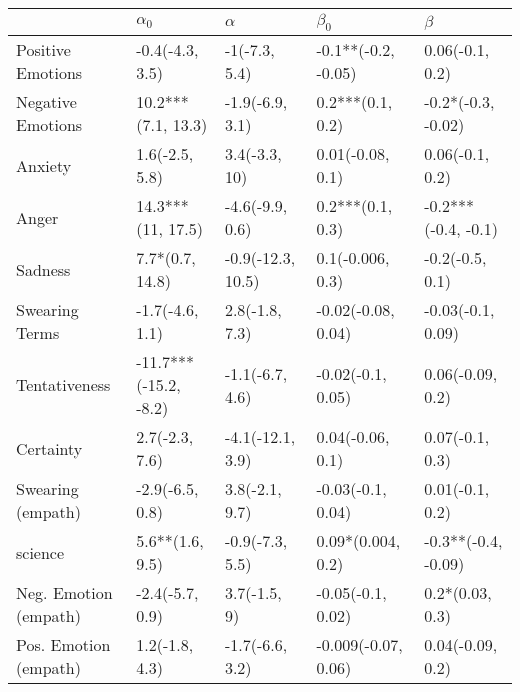 \begin{tabular}{lllll}
\toprule
{} &             $\alpha_0$ &           $\alpha$ &            $\beta_0$ &              $\beta$ \\
\midrule
Positive Emotions     &        -0.4(-4.3, 3.5) &      -1(-7.3, 5.4) &  -0.1**(-0.2, -0.05) &      0.06(-0.1, 0.2) \\
Negative Emotions     &     10.2***(7.1, 13.3) &    -1.9(-6.9, 3.1) &     0.2***(0.1, 0.2) &   -0.2*(-0.3, -0.02) \\
Anxiety               &         1.6(-2.5, 5.8) &      3.4(-3.3, 10) &     0.01(-0.08, 0.1) &      0.06(-0.1, 0.2) \\
Anger                 &      14.3***(11, 17.5) &    -4.6(-9.9, 0.6) &     0.2***(0.1, 0.3) &  -0.2***(-0.4, -0.1) \\
Sadness               &        7.7*(0.7, 14.8) &  -0.9(-12.3, 10.5) &     0.1(-0.006, 0.3) &      -0.2(-0.5, 0.1) \\
Swearing Terms        &        -1.7(-4.6, 1.1) &     2.8(-1.8, 7.3) &   -0.02(-0.08, 0.04) &    -0.03(-0.1, 0.09) \\
Tentativeness         &  -11.7***(-15.2, -8.2) &    -1.1(-6.7, 4.6) &    -0.02(-0.1, 0.05) &     0.06(-0.09, 0.2) \\
Certainty             &         2.7(-2.3, 7.6) &   -4.1(-12.1, 3.9) &     0.04(-0.06, 0.1) &      0.07(-0.1, 0.3) \\
Swearing (empath)     &        -2.9(-6.5, 0.8) &     3.8(-2.1, 9.7) &    -0.03(-0.1, 0.04) &      0.01(-0.1, 0.2) \\
science               &        5.6**(1.6, 9.5) &    -0.9(-7.3, 5.5) &    0.09*(0.004, 0.2) &  -0.3**(-0.4, -0.09) \\
Neg. Emotion (empath) &        -2.4(-5.7, 0.9) &       3.7(-1.5, 9) &    -0.05(-0.1, 0.02) &      0.2*(0.03, 0.3) \\
Pos. Emotion (empath) &         1.2(-1.8, 4.3) &    -1.7(-6.6, 3.2) &  -0.009(-0.07, 0.06) &     0.04(-0.09, 0.2) \\
\bottomrule
\end{tabular}
